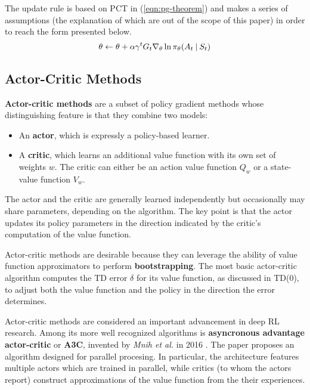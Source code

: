 The update rule is based on PCT in (\ref{eqn:pg-theorem}) and makes a series of assumptions (the explanation of which are out of the scope of this paper) in order to reach the form presented below.
\begin{equation}
    \theta \leftarrow \theta + \alpha \gamma^{t} G_{t} \nabla_{\theta} \ln{\pi_{\theta}(A_{t} \:\vert\: S_{t})}
\end{equation}


\subsection{Actor-Critic Methods} \label{section:actor-critic}
\textbf{Actor-critic methods} are a subset of policy gradient methods whose distinguishing feature is that they combine two models:
\begin{itemize}
    \item An \textbf{actor}, which is expressly a policy-based learner.
    \item A \textbf{critic}, which learns an additional value function with its own set of weights $w$. The critic can either be an action value function $Q_{w}$ or a state-value function $V_{w}$.
\end{itemize}

The actor and the critic are generally learned independently but occasionally may share parameters, depending on the algorithm.
The key point is that the actor updates its policy parameters in the direction indicated by the critic’s computation of the value function.

Actor-critic methods are desirable because they can leverage the ability of value function approximators to perform \textbf{bootstrapping}.
The most basic actor-critic algorithm computes the TD error $\delta$ for its value function, as discussed in TD(0), to adjust both the value function and the policy in the direction the error determines.

Actor-critic methods are considered an important advancement in deep RL research.
Among its more well recognized algorithms is \textbf{asyncronous advantage actor-critic} or \textbf{A3C}, invented by \emph{Mnih et al.} in 2016 \cite{a3c-paper}.
The paper proposes an algorithm designed for parallel procesing.
In particular, the architecture features multiple actors which are trained in parallel, while critics (to whom the actors report) construct approximations of the value function from the their experiences.